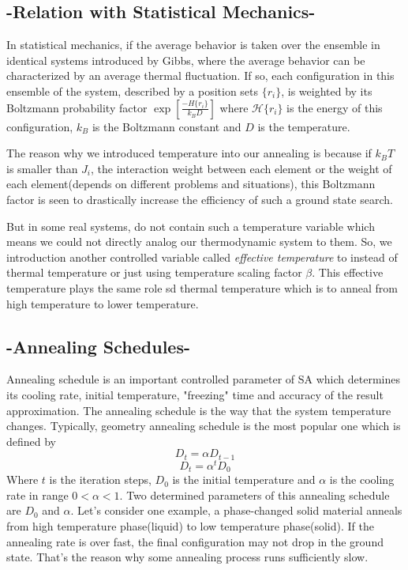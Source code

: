 \documentclass{turabian-researchpaper}
\begin{document}
    \subsection{-Relation with Statistical Mechanics-}
        In statistical mechanics, if the average behavior is taken over the ensemble in identical systems introduced by Gibbs, where the average behavior can be characterized by an average thermal fluctuation. If so, each configuration in this ensemble of the system, described by a position sets $\{r_i\}$, is weighted by its Boltzmann probability factor $\exp\left[ \frac{-H\{r_i\}}{k_BD} \right]$ where $\mathcal{H} \{ r_i\}$ is the energy of this configuration, $k_B$ is the Boltzmann constant and $D$ is the temperature\cite{kirkpatrick1983optimization}.

        The reason why we introduced temperature into our annealing is because if $k_BT$ is smaller than $J_i$, the interaction weight between each element or the weight of each element(depends on different problems and situations), this Boltzmann factor is seen to drastically increase the efficiency of such a ground state search\cite{kirkpatrick1983optimization}.

        But in some real systems, do not contain such a temperature variable which means we could not directly analog our thermodynamic system to them. So, we introduction another controlled variable called \textit{effective temperature} to instead of thermal temperature\cite{kirkpatrick1983optimization} or just using temperature scaling factor $\beta$. This effective temperature plays the same role sd thermal temperature which is to anneal from high temperature to lower temperature.

    \subsection{-Annealing Schedules-}
        Annealing schedule is an important controlled parameter of SA which determines its cooling rate, initial temperature, "freezing" time and accuracy of the result approximation. The annealing schedule is the way that the system temperature changes. Typically, geometry annealing schedule is the most popular one which is defined by\cite{hajek1988cooling} 
            \begin{equation}
                D_t = \alpha D_{t-1}
            \end{equation}
            \begin{equation}
                D_t = \alpha^{t}D_0
            \end{equation}
        Where $t$ is the iteration steps, $D_0$ is the initial temperature and $\alpha$ is the cooling rate in range $ 0 < \alpha < 1$. Two determined parameters of this annealing schedule are $D_0$ and $\alpha$. Let's consider one example, a phase-changed solid material anneals from high temperature phase(liquid) to low temperature phase(solid). If the annealing rate is over fast, the final configuration may not drop in the ground state. That's the reason why some annealing process runs sufficiently slow. 
\end{document}
